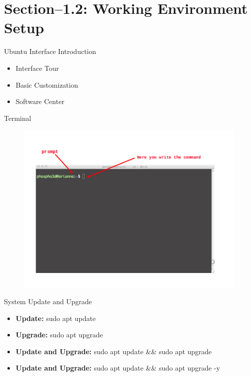 


\maketitle
\section{Section--1.2: Working Environment Setup}
\begin{frame}[t]{Ubuntu Interface Introduction}
    \begin{itemize}
      \item Interface Tour 
      \item Basic Customization 
      \item Software Center 
    \end{itemize}
\end{frame}

\begin{frame}[t]{Terminal}
	\centering
	\begin{figure}[!h]
		\includegraphics[scale=.7]{img/shell.png}
	\end{figure}
\end{frame}

\begin{frame}[t]{System Update and Upgrade}
	\begin{itemize}
		\item \textbf{Update:} sudo apt update 
		\item \textbf{Upgrade:} sudo apt upgrade 
		\item \textbf{Update and Upgrade:} sudo apt update \&\& sudo apt 
		upgrade 
		\item \textbf{Update and Upgrade:} sudo apt update \&\& sudo apt 
		upgrade -y
	\end{itemize}
\end{frame}

